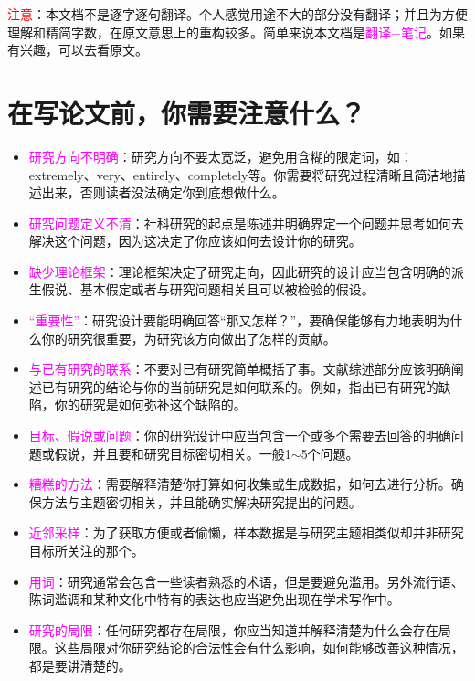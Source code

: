 \documentclass[cn,hazy,blue,14pt,screen]{elegantnote} %
\begin{document}
\textcolor{red}{注意}：本文档不是逐字逐句翻译。个人感觉用途不大的部分没有翻译；并且为方便理解和精简字数，在原文意思上的重构较多。简单来说本文档是\textcolor{magenta}{翻译+笔记}。如果有兴趣，可以去看原文。


\newpage    %
\section{在写论文前，你需要注意什么？}

\begin{itemize}
    \item \textcolor{magenta}{研究方向不明确}：研究方向不要太宽泛，避免用含糊的限定词，如：extremely、very、entirely、completely等。你需要将研究过程清晰且简洁地描述出来，否则读者没法确定你到底想做什么。
    \item \textcolor{magenta}{研究问题定义不清}：社科研究的起点是陈述并明确界定一个问题并思考如何去解决这个问题，因为这决定了你应该如何去设计你的研究。
    \item \textcolor{magenta}{缺少理论框架}：理论框架决定了研究走向，因此研究的设计应当包含明确的派生假说、基本假定或者与研究问题相关且可以被检验的假设。
    \item \textcolor{magenta}{“重要性”}：研究设计要能明确回答“那又怎样？”，要确保能够有力地表明为什么你的研究很重要，为研究该方向做出了怎样的贡献。
    \item \textcolor{magenta}{与已有研究的联系}：不要对已有研究简单概括了事。文献综述部分应该明确阐述已有研究的结论与你的当前研究是如何联系的。例如，指出已有研究的缺陷，你的研究是如何弥补这个缺陷的。
    \item \textcolor{magenta}{目标、假说或问题}：你的研究设计中应当包含一个或多个需要去回答的明确问题或假说，并且要和研究目标密切相关。一般1$\sim$5个问题。
    \item \textcolor{magenta}{糟糕的方法}：需要解释清楚你打算如何收集或生成数据，如何去进行分析。确保方法与主题密切相关，并且能确实解决研究提出的问题。
    \item \textcolor{magenta}{近邻采样}：为了获取方便或者偷懒，样本数据是与研究主题相类似却并非研究目标所关注的那个。
    \item \textcolor{magenta}{用词}：研究通常会包含一些读者熟悉的术语，但是要避免滥用。另外流行语、陈词滥调和某种文化中特有的表达也应当避免出现在学术写作中。
    \item \textcolor{magenta}{研究的局限}：任何研究都存在局限，你应当知道并解释清楚为什么会存在局限。这些局限对你研究结论的合法性会有什么影响，如何能够改善这种情况，都是要讲清楚的。
\end{itemize}
\end{document}
